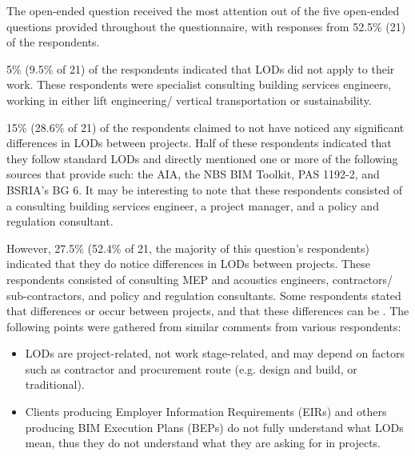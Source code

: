 The open-ended question  received the most attention out of the five open-ended questions provided throughout the questionnaire, with responses from 52.5\% (21) of the respondents.

5\% (9.5\% of 21) of the respondents 
indicated that LODs did not apply to their work.
These respondents were specialist consulting building services engineers, working in either lift engineering/ vertical transportation or sustainability.

15\% (28.6\% of 21) of the respondents claimed to not have noticed any significant differences in LODs between projects.
Half of these respondents indicated that they follow standard LODs and directly mentioned one or more of the following sources that provide such:
the AIA,
the NBS BIM Toolkit,
PAS 1192-2,
and BSRIA's BG 6.
It may be interesting to note that these respondents consisted of a consulting building services engineer, a project manager, and a policy and regulation consultant.

However, 27.5\% (52.4\% of 21, the majority of this question's respondents) indicated that they do notice differences in LODs between projects.
These respondents consisted of consulting MEP and acoustics engineers, contractors/ sub-contractors, and policy and regulation consultants.
Some respondents
stated that differences  or  occur between projects, and that these differences can be .
The following points were gathered from similar comments from various respondents:
\begin{itemize}
    \item LODs are project-related, not work stage-related, and may depend on factors such as contractor and procurement route (e.g. design and build, or traditional).
    
    \item Clients producing Employer Information Requirements (EIRs) and others producing BIM Execution Plans (BEPs) do not fully understand what LODs mean, thus they do not understand what they are asking for in projects.
\end{itemize}

